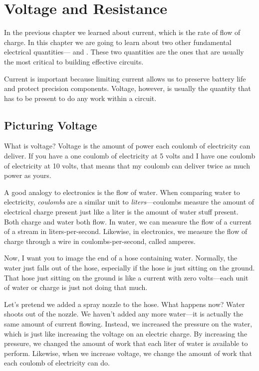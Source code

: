 \chapter{Voltage and Resistance}
\label{chapVoltageResistance}

In the previous chapter we learned about current, which is the rate of flow of charge.
In this chapter we are going to learn about two other fundamental electrical quantities--- and .
These two quantities are the ones that are usually the most critical to building effective circuits.

Current is important because limiting current allows us to preserve battery life and protect precision components.
Voltage, however, is usually the quantity that has to be present to do any work within a circuit.

\section{Picturing Voltage}

What is voltage?
Voltage is the amount of power each coulomb of electricity can deliver.
If you have a one coulomb of electricity at 5 volts and I have one coulomb of electricity at 10 volts, that means that my coulomb can deliver twice as much power as yours.

A good analogy to electronics is the flow of water.
When comparing water to electricity, \emph{coulombs} are a similar unit to \emph{liters}---coulombs measure the amount of electrical charge present just like a liter is the amount of water stuff present.
Both charge and water both flow.
In water, we can measure the flow of a current of a stream in liters-per-second.
Likewise, in electronics, we measure the flow of charge through a wire in coulombs-per-second, called amperes.

Now, I want you to image the end of a hose containing water.
Normally, the water just falls out of the hose, especially if the hose is just sitting on the ground.
That hose just sitting on the ground is like a current with zero volts---each unit of water or charge is just not doing that much.

Let's pretend we added a spray nozzle to the hose.
What happens now?
Water shoots out of the nozzle.
We haven't added any more water---it is actually the same amount of current flowing.
Instead, we increased the pressure on the water, which is just like increasing the voltage on an electric charge.
By increasing the pressure, we changed the amount of work that each liter of water is available to perform.
Likewise, when we increase voltage, we change the amount of work that each coulomb of electricity can do.

